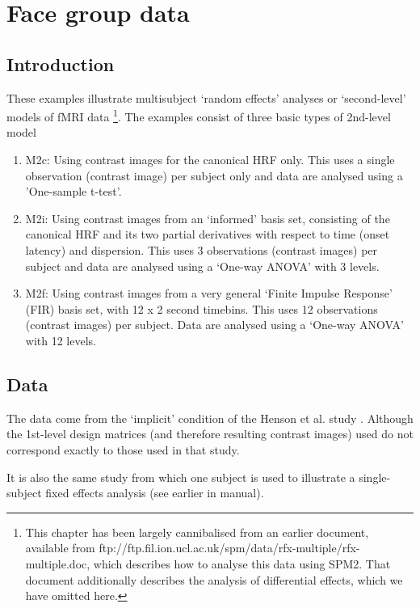 
\chapter{Face group data}

\section{Introduction}

These examples illustrate multisubject `random effects' analyses or `second-level' models of fMRI data \cite{will_hbf2_rfx}\footnote{This chapter has been largely cannibalised from an earlier document, available from {\sf ftp://ftp.fil.ion.ucl.ac.uk/spm/data/rfx-multiple/rfx-multiple.doc}, which describes how to analyse this data using SPM2. 
That document additionally describes the analysis of differential effects, which we have omitted here.  }. 
The examples consist of three basic types of 2nd-level model
\begin{enumerate}
\item{M2c: Using contrast images for the canonical HRF only. This uses a single observation (contrast image) per subject only and data are 
analysed using a 'One-sample t-test'.}
\item{M2i: Using contrast images from an `informed' basis set, consisting of the canonical HRF and its two partial derivatives with respect to time (onset latency) and dispersion. This uses
3 observations (contrast images) per subject and data are 
analysed using a `One-way ANOVA' with 3 levels.}
\item{M2f: Using contrast images from a very general `Finite Impulse Response' (FIR) basis set, with 12 x 2 second timebins. This 
uses 12 observations (contrast images) per subject. Data are 
analysed using a `One-way ANOVA' with 12 levels.}
\end{enumerate}

\section{Data}

The data come from the `implicit' condition of the Henson 
et al. study \cite{rik_face_rep}. Although the 1st-level design matrices (and therefore resulting contrast images) used do not correspond exactly to those used in that study.

It is also the same study from which one subject is used to illustrate a single-subject fixed effects analysis (see earlier in manual).

